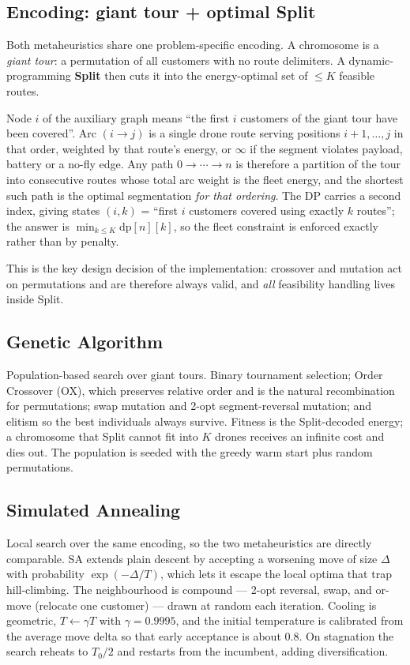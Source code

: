 \documentclass[11pt,a4paper]{article}
\begin{document}
\subsection{Encoding: giant tour + optimal Split}
\label{sec:split}

Both metaheuristics share one problem-specific encoding. A chromosome is a
\emph{giant tour}: a permutation of all customers with no route delimiters. A
dynamic-programming \textbf{Split} then cuts it into the energy-optimal set of
$\le K$ feasible routes.

Node $i$ of the auxiliary graph means ``the first $i$ customers of the giant tour
have been covered''. Arc $(i \rightarrow j)$ is a single drone route serving
positions $i+1,\dots,j$ in that order, weighted by that route's energy, or
$\infty$ if the segment violates payload, battery or a no-fly edge. Any path
$0 \rightarrow \cdots \rightarrow n$ is therefore a partition of the tour into
consecutive routes whose total arc weight is the fleet energy, and the shortest
such path is the optimal segmentation \emph{for that ordering}. The DP carries a
second index, giving states $(i,k)$ = ``first $i$ customers covered using exactly
$k$ routes''; the answer is $\min_{k \le K} \mathrm{dp}[n][k]$, so the fleet
constraint is enforced exactly rather than by penalty.

This is the key design decision of the implementation: crossover and mutation act
on permutations and are therefore always valid, and \emph{all} feasibility
handling lives inside Split.

\subsection{Genetic Algorithm}

Population-based search over giant tours. Binary tournament selection; Order
Crossover (OX), which preserves relative order and is the natural recombination
for permutations; swap mutation and 2-opt segment-reversal mutation; and elitism
so the best individuals always survive. Fitness is the Split-decoded energy; a
chromosome that Split cannot fit into $K$ drones receives an infinite cost and
dies out. The population is seeded with the greedy warm start plus random
permutations.

\subsection{Simulated Annealing}

Local search over the same encoding, so the two metaheuristics are directly
comparable. SA extends plain descent by accepting a worsening move of size
$\Delta$ with probability $\exp(-\Delta/T)$, which lets it escape the local optima
that trap hill-climbing. The neighbourhood is compound --- 2-opt reversal, swap,
and or-move (relocate one customer) --- drawn at random each iteration. Cooling is
geometric, $T \leftarrow \gamma T$ with $\gamma = 0.9995$, and the initial
temperature is calibrated from the average move delta so that early acceptance is
about $0.8$. On stagnation the search reheats to $T_0/2$ and restarts from the
incumbent, adding diversification.
\end{document}
